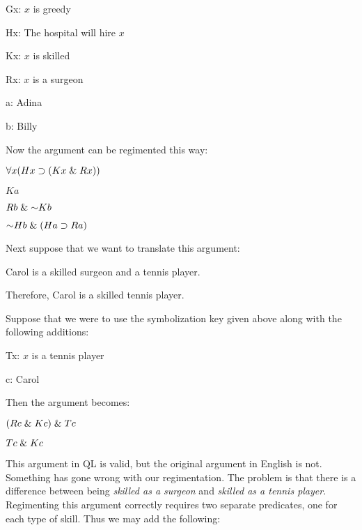 \begin{ekey}
  \item[Gx:] $x$ is greedy
  \item[Hx:] The hospital will hire $x$
  \item[Kx:] $x$ is skilled
  \item[Rx:] $x$ is a surgeon
  \item[a:] Adina
  \item[b:] Billy
\end{ekey}

Now the argument can be regimented this way:

\begin{earg}
\label{surgeon2}
  \item[] $\forall x(Hx \supset (Kx \mathrel\& Rx))$
  \item[] $Ka$
  \item[] $Rb \eand \enot Kb$
  \item[\therefore] $\enot Hb \eand (Ha \eif Ra)$
\end{earg}

Next suppose that we want to translate this argument:

\begin{earg}
\label{surgeon3}
  \item[] Carol is a skilled surgeon and a tennis player.
  \item[\therefore] Therefore, Carol is a skilled tennis player.
\end{earg}

Suppose that we were to use the symbolization key given above along with the following additions:

\begin{ekey}
  \item[Tx:] $x$ is a tennis player
  \item[c:] Carol
\end{ekey}

Then the argument becomes:

\begin{earg}
\item[] $(Rc \mathrel\& Kc) \mathrel\& Tc$
\item[\therefore] $Tc \mathrel\& Kc$
\end{earg}

This argument in QL is valid, but the original argument in English is not.
Something has gone wrong with our regimentation.
The problem is that there is a difference between being \emph{skilled as a surgeon} and \emph{skilled as a tennis player}.
Regimenting this argument correctly requires two separate predicates, one for each type of skill.
Thus we may add the following:

